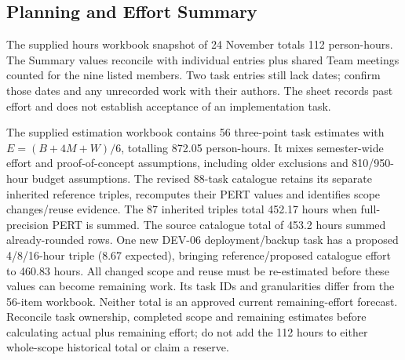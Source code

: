 \subsection{Planning and Effort Summary}\label{sec:project-planning}
The supplied hours workbook snapshot of 24 November totals 112 person-hours.
The Summary values reconcile with individual entries plus shared Team meetings
counted for the nine listed members. Two task entries still lack dates;
confirm those dates and any unrecorded work with their authors. The sheet records
past effort and does not establish acceptance of an implementation task.

The supplied estimation workbook contains 56 three-point task estimates with
\(E=(B+4M+W)/6\), totalling 872.05 person-hours. It mixes semester-wide effort and
proof-of-concept assumptions, including older exclusions and 810/950-hour budget
assumptions. The revised 88-task catalogue retains its separate inherited reference
triples, recomputes their PERT values and identifies scope changes/reuse evidence.
The 87 inherited triples total 452.17 hours when full-precision PERT is summed.
The source catalogue total of 453.2 hours summed already-rounded rows. One new
DEV-06 deployment/backup task has a proposed 4/8/16-hour triple (8.67 expected),
bringing reference/proposed catalogue effort to 460.83 hours. All changed scope
and reuse must be re-estimated before these values can become remaining work.
Its task IDs and granularities differ from the 56-item workbook. Neither total is
an approved current remaining-effort forecast. Reconcile task ownership, completed
scope and remaining estimates before calculating actual plus remaining effort;
do not add the 112 hours to either whole-scope historical total or claim a reserve.

